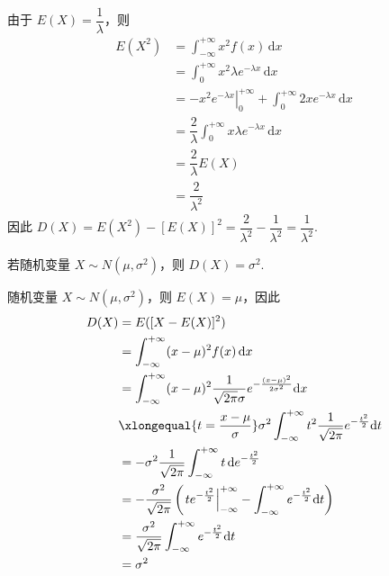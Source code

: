 \vspace{-1.5em}

\begin{myproof}
    由于 $E(X) = \dfrac{1}{\lambda}$，则
    $$
    \begin{aligned}
        E(X^2) &= \int_{-\infty}^{+\infty} x^2 f(x) \, \text{d}x \\
        &= \int_0^{+\infty} x^2 \lambda e^{-\lambda x} \, \text{d}x \\
        &= \left. -x^2 e^{-\lambda x} \right|_0^{+\infty} + \int_0^{+\infty} 2x e^{-\lambda x} \, \text{d}x \\
        &= \dfrac{2}{\lambda} \int_0^{+\infty} x \lambda e^{-\lambda x} \, \text{d}x \\
        &= \dfrac{2}{\lambda} E(X) \\
        &= \dfrac{2}{\lambda^2}
    \end{aligned}
    $$
    因此 $D(X) = E(X^2) - [E(X)]^2 = \dfrac{2}{\lambda^2} - \dfrac{1}{\lambda^2} = \dfrac{1}{\lambda^2}$.
\end{myproof}

\vspace{-0.7em}

\begin{conclusion}
    若随机变量 $X \sim N(\mu,\sigma^2)$，则 $D(X) = \sigma^2$.
\end{conclusion}

\vspace{-1.5em}

\begin{myproof}
    随机变量 $X \sim N(\mu,\sigma^2)$，则 $E(X)=\mu$，因此
    $$
    \begin{aligned}
        D(X) &= E([X-E(X)]^2) \\
        &= \int_{-\infty}^{+\infty} (x-\mu)^2 f(x) \, \text{d}x \\
        &= \int_{-\infty}^{+\infty} (x-\mu)^2 \dfrac{1}{\sqrt{2 \pi} \sigma} e^{-\frac{(x-\mu)^2}{2 \sigma^2}} \text{d}x \\
        & \xlongequal{t = \frac{x-\mu}{\sigma}} \sigma^2 \int_{-\infty}^{+\infty} t^2 \dfrac{1}{\sqrt{2 \pi}} e^{-\frac{t^2}{2}} \text{d}t \\
        &= -\sigma^2 \dfrac{1}{\sqrt{2 \pi}} \int_{-\infty}^{+\infty} t \, \text{d} e^{-\frac{t^2}{2}} \\
        &= -\dfrac{\sigma^2}{\sqrt{2 \pi}} \left( \left. t e^{-\frac{t^2}{2}} \right|_{-\infty}^{+\infty} - \int_{-\infty}^{+\infty} e^{-\frac{t^2}{2}} \text{d}t \right) \\
        &= \dfrac{\sigma^2}{\sqrt{2 \pi}} \int_{-\infty}^{+\infty} e^{-\frac{t^2}{2}} \text{d}t \\
        &= \sigma^2
    \end{aligned}
    $$

    \vspace{-2.2em}
\end{myproof}

